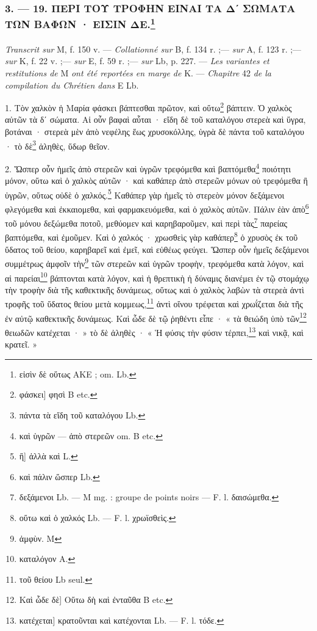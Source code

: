 \documentclass[a4paper, 11pt, oneside, polutonikogreek, french]{article}
\begin{document}
\subsubsection[3. --- 19. ΠΕΡΙ ΤΟΥ ΤΡΟΦΗΝ ΕΙΝΑΙ ΤΑ Δʹ ΣΩΜΑΤΑ ΤΩΝ ΒΑΦΩΝ · ΕΙΣΙΝ ΔΕ.]{3. --- 19. ΠΕΡΙ ΤΟΥ ΤΡΟΦΗΝ ΕΙΝΑΙ ΤΑ Δʹ ΣΩΜΑΤΑ ΤΩΝ ΒΑΦΩΝ · ΕΙΣΙΝ ΔΕ.\footnote{εἰσὶν δὲ οὕτως AKE ; om. Lb.}}
\paragraph{}
\emph{Transcrit sur} M, f. 150 v. --- \emph{Collationné sur} B, f. 134 r. ;--- \emph{sur} A, f. 123 r. ;--- \emph{sur} K, f. 22 v. ;--- \emph{sur} E, f. 59 r. ;--- \emph{sur} Lb, p. 227. --- \emph{Les variantes et restitutions de} M \emph{ont été reportées en marge de} K. --- \emph{Chapitre} 42 \emph{de la compilation du Chrétien dans} E Lb.

\bigskip

1. Τὸν χαλκὸν ἡ Μαρία φάσκει βάπτεσθαι πρῶτον, καὶ οὕτω\footnote{φάσκει] φησὶ B etc.} βάπτειν. Ὁ χαλκὸς αὐτῶν τὰ δʹ σώματα. Αἱ οὖν βαφαὶ αὗται · εἴδη δὲ τοῦ καταλόγου στερεὰ καὶ ὕγρα, βοτάναι · στερεὰ μὲν ἀπὸ νεφέλης ἕως χρυσοκόλλης, ὑγρὰ δὲ πάντα τοῦ καταλόγου · τὸ δὲ\footnote{πάντα τὰ εἴδη τοῦ καταλόγου Lb.} ἀληθὲς, ὕδωρ θεῖον.

2. Ὥσπερ οὖν ἡμεῖς ἀπὸ στερεῶν καὶ ὑγρῶν τρεφόμεθα καὶ βαπτόμεθα\footnote{καὶ ὑγρῶν --- ἀπὸ στερεῶν om. B etc.} ποιότητι μόνον, οὕτω καὶ ὁ χαλκὸς αὐτῶν · καὶ καθάπερ ἀπὸ στερεῶν μόνων οὐ τρεφόμεθα ἢ ὑγρῶν, οὕτως οὐδὲ ὁ χαλκός.\footnote{ἢ] ἀλλὰ καὶ L.} Καθάπερ γὰρ ἡμεῖς τὸ στερεὸν μόνον δεξάμενοι φλεγόμεθα καὶ ἐκκαιομεθα, καὶ φαρμακευόμεθα, καὶ ὁ χαλκὸς αὐτῶν. Πάλιν ἐὰν ἀπὸ\footnote{καὶ πάλιν ὥσπερ Lb.} τοῦ μόνου δεξώμεθα ποτοῦ, μεθύομεν καὶ καρηβαροῦμεν, καὶ περὶ τὰς\footnote{δεξάμενοι Lb. --- M mg. : groupe de points noirs --- F. l. δαισώμεθα.} παρείας βαπτόμεθα, καὶ ἐμοῦμεν. Καὶ ὁ χαλκός · χρωσθεὶς γὰρ καθάπερ\footnote{οὕτω καὶ ὁ χαλκός Lb. --- F. l. χρωϊσθεὶς.} ὁ χρυσὸς ἐκ τοῦ ὕδατος τοῦ θείου, καρηβαρεῖ καὶ ἐμεῖ, καὶ εὐθέως φεύγει. Ὥσπερ οὖν ἡμεῖς δεξάμενοι συμμέτρως ἀμφοῖν τὴν\footnote{ἀμφὺν. M} τῶν στερεῶν καὶ ὑγρῶν τροφὴν, τρεφόμεθα κατὰ λόγον, καὶ αἱ παρείαι\footnote{καταλόγον A.} βάπτονται κατὰ λόγον, καὶ ἡ θρεπτικὴ ἡ δύναμις διανέμει ἐν τῷ στομάχῳ τὴν τροφὴν διὰ τῆς καθεκτικῆς δυνάμεως, οὕτως καὶ ὁ χαλκὸς λαβὼν τὰ στερεὰ ἀντὶ τροφῆς τοῦ ὕδατος θείου μετὰ κομμεως,\footnote{τοῦ θείου Lb seul.} ἀντὶ οἴνου τρέφεται καὶ χρωΐζεται διὰ τῆς ἐν αὐτῷ καθεκτικῆς δυνάμεως. Καὶ ὧδε δὲ τῷ ῥηθέντι εἶπε · « τὰ θειώδη ὑπὸ τῶν\footnote{Καὶ ὧδε δὲ] Οὕτω δὴ καὶ ἐνταῦθα B etc.} θειωδῶν κατέχεται · » τὸ δὲ ἀληθὲς · « Ἡ φύσις τὴν φύσιν τέρπει,\footnote{κατέχεται] κρατοῦνται καὶ κατέχονται Lb. --- F. l. τόδε.} καὶ νικᾷ, καὶ κρατεῖ. »
\end{document}
